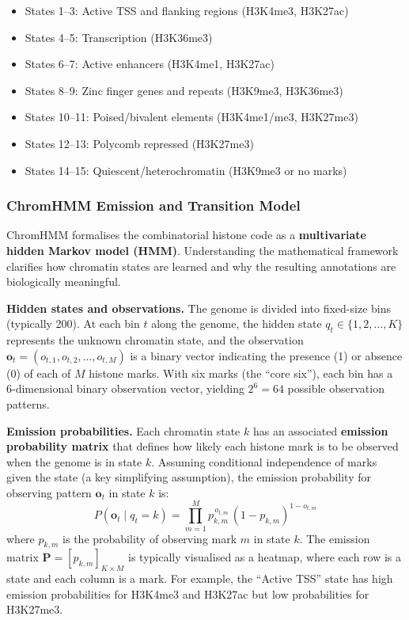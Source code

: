\begin{keyconcept}[title={Typical ChromHMM States (15-State Model)}]
\begin{itemize}[itemsep=1pt]
  \item States 1--3: Active TSS and flanking regions (H3K4me3, H3K27ac)
  \item States 4--5: Transcription (H3K36me3)
  \item States 6--7: Active enhancers (H3K4me1, H3K27ac)
  \item States 8--9: Zinc finger genes and repeats (H3K9me3, H3K36me3)
  \item States 10--11: Poised/bivalent elements (H3K4me1/me3, H3K27me3)
  \item States 12--13: Polycomb repressed (H3K27me3)
  \item States 14--15: Quiescent/heterochromatin (H3K9me3 or no marks)
\end{itemize}
\end{keyconcept}

\subsubsection{ChromHMM Emission and Transition Model}
\label{subsubsec:histones:chromhmm-model}

ChromHMM formalises the combinatorial histone code as a \textbf{multivariate hidden Markov model (HMM)}. Understanding the mathematical framework clarifies how chromatin states are learned and why the resulting annotations are biologically meaningful.

\textbf{Hidden states and observations.} The genome is divided into fixed-size bins (typically 200\basepair{}). At each bin $t$ along the genome, the hidden state $q_t \in \{1, 2, \ldots, K\}$ represents the unknown chromatin state, and the observation $\mathbf{o}_t = (o_{t,1}, o_{t,2}, \ldots, o_{t,M})$ is a binary vector indicating the presence (1) or absence (0) of each of $M$ histone marks. With six marks (the ``core six''), each bin has a 6-dimensional binary observation vector, yielding $2^6 = 64$ possible observation patterns.

\textbf{Emission probabilities.} Each chromatin state $k$ has an associated \textbf{emission probability matrix} that defines how likely each histone mark is to be observed when the genome is in state $k$. Assuming conditional independence of marks given the state (a key simplifying assumption), the emission probability for observing pattern $\mathbf{o}_t$ in state $k$ is:
\begin{equation}
\label{eq:histones:chromhmm-emission}
P(\mathbf{o}_t \mid q_t = k) = \prod_{m=1}^{M} p_{k,m}^{\,o_{t,m}} \,(1 - p_{k,m})^{1 - o_{t,m}}
\end{equation}
where $p_{k,m}$ is the probability of observing mark $m$ in state $k$. The emission matrix $\mathbf{P} = [p_{k,m}]_{K \times M}$ is typically visualised as a heatmap, where each row is a state and each column is a mark. For example, the ``Active TSS'' state has high emission probabilities for H3K4me3 and H3K27ac but low probabilities for H3K27me3.


